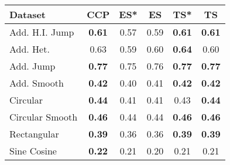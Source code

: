 \begin{tabular}{lccccc}
\toprule
Dataset & CCP & ES* & ES & TS* & TS \\
\midrule
Add. H.I. Jump & \textbf{0.61} & 0.57 & 0.59 & \textbf{0.61} & \textbf{0.61} \\
Add. Het. & 0.63 & 0.59 & 0.60 & \textbf{0.64} & 0.60 \\
Add. Jump & \textbf{0.77} & 0.75 & 0.76 & \textbf{0.77} & \textbf{0.77} \\
Add. Smooth & \textbf{0.42} & 0.40 & 0.41 & \textbf{0.42} & \textbf{0.42} \\
Circular & \textbf{0.44} & 0.41 & 0.41 & 0.43 & \textbf{0.44} \\
Circular Smooth & \textbf{0.46} & 0.44 & 0.44 & \textbf{0.46} & \textbf{0.46} \\
Rectangular & \textbf{0.39} & 0.36 & 0.36 & \textbf{0.39} & \textbf{0.39} \\
Sine Cosine & \textbf{0.22} & 0.21 & 0.20 & 0.21 & 0.21 \\
\bottomrule
\end{tabular}